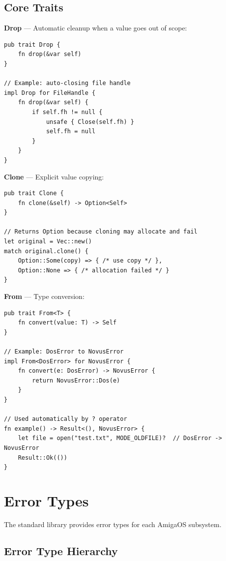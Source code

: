 \subsection{Core Traits}

\textbf{Drop} --- Automatic cleanup when a value goes out of scope:

\begin{lstlisting}
pub trait Drop {
    fn drop(&var self)
}

// Example: auto-closing file handle
impl Drop for FileHandle {
    fn drop(&var self) {
        if self.fh != null {
            unsafe { Close(self.fh) }
            self.fh = null
        }
    }
}
\end{lstlisting}

\textbf{Clone} --- Explicit value copying:

\begin{lstlisting}
pub trait Clone {
    fn clone(&self) -> Option<Self>
}

// Returns Option because cloning may allocate and fail
let original = Vec::new()
match original.clone() {
    Option::Some(copy) => { /* use copy */ },
    Option::None => { /* allocation failed */ }
}
\end{lstlisting}

\textbf{From} --- Type conversion:

\begin{lstlisting}
pub trait From<T> {
    fn convert(value: T) -> Self
}

// Example: DosError to NovusError
impl From<DosError> for NovusError {
    fn convert(e: DosError) -> NovusError {
        return NovusError::Dos(e)
    }
}

// Used automatically by ? operator
fn example() -> Result<(), NovusError> {
    let file = open("test.txt", MODE_OLDFILE)?  // DosError -> NovusError
    Result::Ok(())
}
\end{lstlisting}

\section{Error Types}
\label{sec:stdlib-errors}

The standard library provides error types for each AmigaOS subsystem.

\subsection{Error Type Hierarchy}

